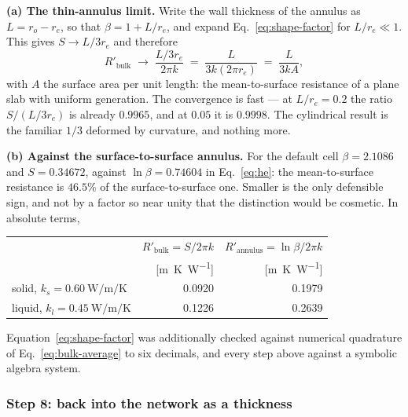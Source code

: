 \noindent\textbf{(a) The thin-annulus limit.} Write the wall thickness of the
annulus as $L=r_{o}-r_{e}$, so that $\beta=1+L/r_{e}$, and expand
Eq.~\eqref{eq:shape-factor} for $L/r_{e}\ll1$. This gives $S\to L/3r_{e}$ and
therefore
\begin{equation}
  R'_{\mathrm{bulk}} \;\longrightarrow\;
  \frac{L/3r_{e}}{2\pi k}
  \;=\; \frac{L}{3k\left(2\pi r_{e}\right)}
  \;=\; \frac{L}{3kA},
  \label{eq:slab-limit}
\end{equation}
with $A$ the surface area per unit length: the mean-to-surface resistance of a
plane slab with uniform generation. The convergence is fast --- at $L/r_{e}=0.2$
the ratio $S/(L/3r_{e})$ is already $0.9965$, and at $0.05$ it is $0.9998$. The
cylindrical result is the familiar $1/3$ deformed by curvature, and nothing
more.

\medskip
\noindent\textbf{(b) Against the surface-to-surface annulus.} For the default
cell $\beta=2.1086$ and $S=0.34672$, against $\ln\beta=0.74604$ in
Eq.~\eqref{eq:he}: the mean-to-surface resistance is $46.5\%$ of the
surface-to-surface one. Smaller is the only defensible sign, and not by a
factor so near unity that the distinction would be cosmetic. In absolute terms,

\begin{center}
\begin{tabular}{@{}l r r@{}}
\toprule
 & $R'_{\mathrm{bulk}}=S/2\pi k$ & $R'_{\mathrm{annulus}}=\ln\beta/2\pi k$ \\
 & [\si{\meter\kelvin\per\watt}] & [\si{\meter\kelvin\per\watt}] \\
\midrule
solid, $k_{s}=\SI{0.60}{\watt\per\meter\per\kelvin}$  & 0.0920 & 0.1979 \\
liquid, $k_{l}=\SI{0.45}{\watt\per\meter\per\kelvin}$ & 0.1226 & 0.2639 \\
\bottomrule
\end{tabular}
\end{center}

\noindent
Equation~\eqref{eq:shape-factor} was additionally checked against numerical
quadrature of Eq.~\eqref{eq:bulk-average} to six decimals, and every step above
against a symbolic algebra system.

\subsubsection*{Step 8: back into the network as a thickness}

